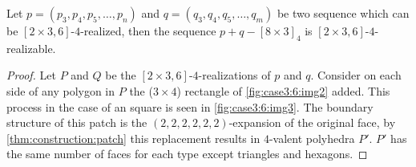 \begin{lemma}\label{thm:case3:6:compose}
  Let $p = (p_3, p_4, p_5, \dots, p_n)$ and $q = (q_3, q_4, q_5, \dots, q_m)$ be two sequence which can be $[2 \times 3, 6]$-$4$-realized, then the sequence $p + q - [8 \times 3]_4$ is $[2\times3, 6]$-$4$-realizable. 
  \begin{proof}
    Let $P$ and $Q$ be the $[2 \times 3, 6]$-$4$-realizations of $p$ and $q$. Consider on each side of any polygon in $P$ the ($3 \times 4$) rectangle of \autoref{fig:case3:6:img2} added. This process in the case of an square is seen in \autoref{fig:case3:6:img3}. The boundary structure of this patch is the $(2, 2, 2, 2, 2, 2)$-expansion of the original face, by \autoref{thm:construction:patch} this replacement results in $4$-valent polyhedra $P'$. $P'$ has the same number of faces for each type except triangles and hexagons.
    

\end{proof}
\end{lemma}

